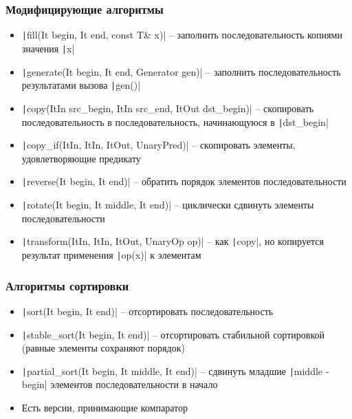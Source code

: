 \documentclass[10pt]{beamer}
\begin{document}
\begin{frame}[fragile]
\frametitle{Модифицирующие алгоритмы}
\begin{itemize}
\item \texttt|fill(It begin, It end, const T& x)| -- заполнить последовательность копиями значения \texttt|x|
\pause
\item \texttt|generate(It begin, It end, Generator gen)| -- заполнить последовательность результатами вызова \texttt|gen()|
\pause
\item \texttt|copy(ItIn src_begin, ItIn src_end, ItOut dst_begin)| -- скопировать последовательность в последовательность, начинающуюся в \texttt|dst_begin|
\pause
\item \texttt|copy_if(ItIn, ItIn, ItOut, UnaryPred)| -- скопировать элементы, удовлетворяющие предикату
\pause
\item \texttt|reverse(It begin, It end)| -- обратить порядок элементов последовательности
\pause
\item \texttt|rotate(It begin, It middle, It end)| -- циклически сдвинуть элементы последовательности
\pause
\item \texttt|transform(ItIn, ItIn, ItOut, UnaryOp op)| -- как \texttt|copy|, но копируется результат применения \texttt|op(x)| к элементам
\end{itemize}
\end{frame}

\begin{frame}[fragile]
\frametitle{Алгоритмы сортировки}
\begin{itemize}
\item \texttt|sort(It begin, It end)| -- отсортировать последовательность
\pause
\item \texttt|stable_sort(It begin, It end)| -- отсортировать стабильной сортировкой (равные элементы сохраняют порядок)
\pause
\item \texttt|partial_sort(It begin, It middle, It end)| -- сдвинуть младшие \texttt|middle - begin| элементов последовательности в начало
\pause
\item Есть версии, принимающие компаратор
\end{itemize}
\end{frame}
\end{document}
